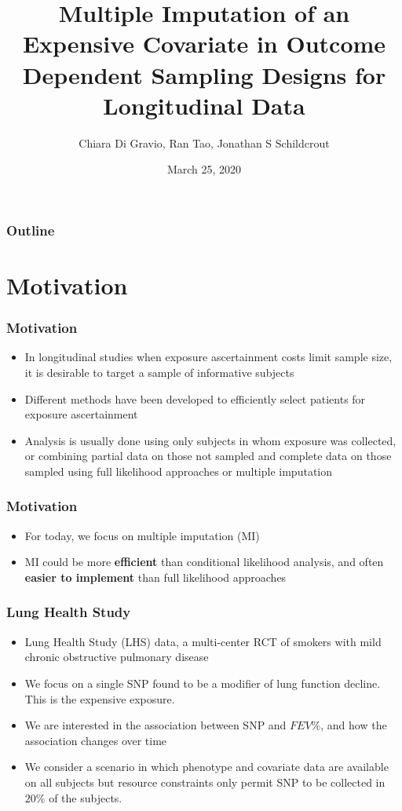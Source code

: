 \documentclass[pdf]{beamer}
\title[Multiple Imputation]{Multiple Imputation of an Expensive Covariate in Outcome Dependent Sampling Designs for Longitudinal Data}
\author[Chiara Di Gravo]{Chiara Di Gravio, Ran Tao, Jonathan S Schildcrout}
\institute[]{Vanderbilt University \\ Virtual ENAR, 2020}
\date{March 25, 2020}
\begin{document}
	
\begin{frame}
\titlepage
\end{frame}	

\begin{frame}
\frametitle{Outline}
\tableofcontents
\end{frame}	



\section{Motivation}

\begin{frame}
\frametitle{Motivation}
\begin{itemize}
	\setlength\itemsep{1.5em}
	\item In longitudinal studies when exposure ascertainment costs limit sample size, it is desirable to target a sample of informative subjects
	\item Different methods have been developed to efficiently select patients for exposure ascertainment
	\item Analysis is usually done using only subjects in whom exposure was collected, or combining partial data on those not sampled and complete data on those sampled using full likelihood approaches or multiple imputation
\end{itemize}
\end{frame}

\begin{frame}
\frametitle{Motivation}
\begin{itemize}
	\setlength\itemsep{1.5em}
	\item For today, we focus on multiple imputation (MI)
	\item MI could be more \textbf{efficient} than conditional likelihood analysis, and often \textbf{easier to implement} than full likelihood approaches
\end{itemize}
\end{frame}	

\begin{frame}
\frametitle{Lung Health Study}
\begin{itemize}
	\setlength\itemsep{0.8em}
	\item Lung Health Study (LHS) data, a multi-center RCT of smokers with mild chronic obstructive pulmonary disease
	\item We focus on a single SNP found to be a modifier of lung function decline. This is the expensive exposure.
	\item We are interested in the association between SNP and $FEV\%$, and how the association changes over time
	\item We consider a scenario in which phenotype and covariate data are available on all subjects but resource constraints only permit SNP to be collected in $20\%$ of the subjects.
\end{itemize}
\end{frame}	
\end{document}
